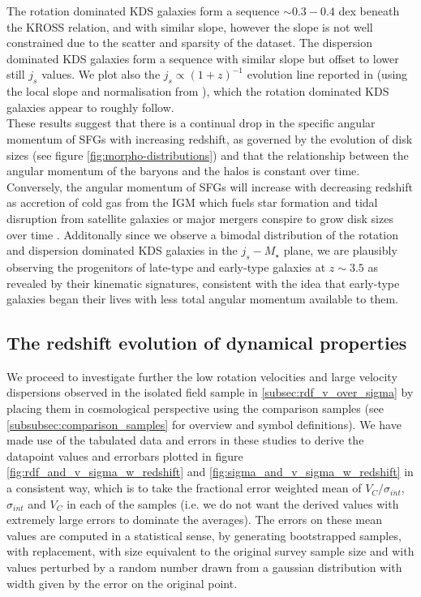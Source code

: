 \documentclass[fleqn,usenatbib]{mn2e}
\begin{document}
The rotation dominated KDS galaxies form a sequence $\sim 0.3-0.4$ dex beneath the KROSS relation, and with similar slope, however the slope is not well constrained due to the scatter and sparsity of the dataset.
The dispersion dominated KDS galaxies form a sequence with similar slope but offset to lower still $j_{s}$ values.
We plot also the $j_{s} \propto (1+z)^{-1}$ evolution line reported in \cite{Swinbank2017} (using the local slope and normalisation from \cite{Romanowsky2012}), which the rotation dominated KDS galaxies appear to roughly follow. \\

These results suggest that there is a continual drop in the specific angular momentum of SFGs with increasing redshift, as governed by the evolution of disk sizes \citep[e.g.][]{Trujillo2007} (see figure \ref{fig:morpho-distributions}) and that the relationship between the angular momentum of the baryons and the halos is constant over time.
Conversely, the angular momentum of SFGs will increase with decreasing redshift as accretion of cold gas from the IGM which fuels star formation and tidal disruption from satellite galaxies or major mergers conspire to grow disk sizes over time \citep{Trujillo2007,Buitrago2008,VanderWel2014a}.
Additonally since we observe a bimodal distribution of the rotation and dispersion dominated KDS galaxies in the $j_{s}-M_{\star}$ plane, we are plausibly observing the progenitors of late-type and early-type galaxies at $z\sim3.5$ as revealed by their kinematic signatures, consistent with the idea that early-type galaxies began their lives with less total angular momentum available to them.


\subsection{The redshift evolution of dynamical properties}\label{subsec:redshift_evolution}
We proceed to investigate further the low rotation velocities and large velocity dispersions observed in the isolated field sample in \cref{subsec:rdf_v_over_sigma} by placing them in cosmological perspective using the comparison samples (see \cref{subsubsec:comparison_samples} for overview and symbol definitions).
We have made use of the tabulated data and errors in these studies to derive the datapoint values and errorbars plotted in figure \ref{fig:rdf_and_v_sigma_w_redshift} and \ref{fig:sigma_and_v_sigma_w_redshift} in a consistent way, which is to take the fractional error weighted mean of $V_{C}/\sigma_{int}$, $\sigma_{int}$ and $V_{C}$ in each of the samples (i.e. we do not want the derived values with extremely large errors to dominate the averages).
The errors on these mean values are computed in a statistical sense, by generating bootstrapped samples, with replacement, with size equivalent to the original survey sample size and with values perturbed by a random number drawn from a gaussian distribution with width given by the error on the original point. \\
\end{document}
